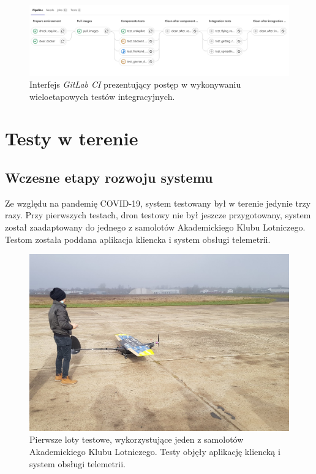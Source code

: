 \begin{figure}[H]
	\centering
	\includegraphics[width=\linewidth]{rys05/pipeline.png}
    \caption{
        Interfejs \textit{GitLab CI} prezentujący postęp w wykonywaniu
        wieloetapowych testów integracyjnych.
    }
	\label{pipeline_gitlab_ci}
\end{figure}

\section{Testy w terenie}

\subsection{Wczesne etapy rozwoju systemu} \label{early_tests}

Ze względu na pandemię COVID-19, system testowany był w terenie jedynie trzy razy.
Przy pierwszych testach, dron testowy nie był jeszcze przygotowany, system został 
zaadaptowany do jednego z samolotów Akademickiego Klubu Lotniczego. Testom została
poddana aplikacja kliencka i system obsługi telemetrii.

\begin{figure}[H]
	\centering
	\includegraphics[width=0.8\linewidth]{rys05/test_sae.jpg}
    \caption{
        Pierwsze loty testowe, wykorzystujące jeden z samolotów Akademickiego
        Klubu Lotniczego. Testy objęły aplikację kliencką i system obsługi telemetrii.
    }
	\label{test_sae}
\end{figure}

